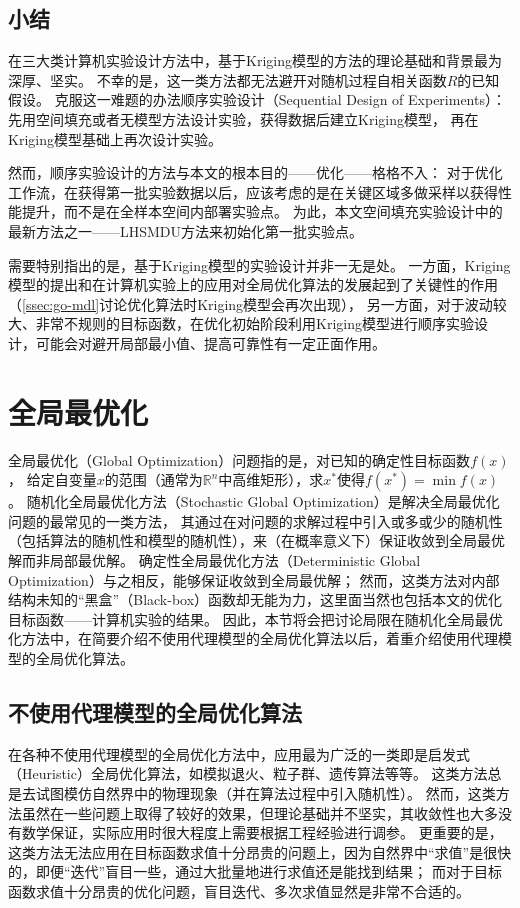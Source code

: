 \documentclass[index]{subfiles}
\begin{document}
\subsection{小结}
在三大类计算机实验设计方法中，基于Kriging模型的方法的理论基础和背景最为深厚、坚实。
不幸的是，这一类方法都无法避开对随机过程自相关函数$R$的已知假设。
克服这一难题的办法顺序实验设计（Sequential Design of Experiments）：
先用空间填充或者无模型方法设计实验，获得数据后建立Kriging模型，
再在Kriging模型基础上再次设计实验。

然而，顺序实验设计的方法与本文的根本目的——优化——格格不入：
对于优化工作流，在获得第一批实验数据以后，应该考虑的是在关键区域多做采样以获得性能提升，而不是在全样本空间内部署实验点。
为此，本文空间填充实验设计中的最新方法之一——LHSMDU方法来初始化第一批实验点。

需要特别指出的是，基于Kriging模型的实验设计并非一无是处。
一方面，Kriging模型的提出和在计算机实验上的应用对全局优化算法的发展起到了关键性的作用（\cref{ssec:go-mdl}讨论优化算法时Kriging模型会再次出现），
另一方面，对于波动较大、非常不规则的目标函数，在优化初始阶段利用Kriging模型进行顺序实验设计，可能会对避开局部最小值、提高可靠性有一定正面作用。

\section{全局最优化}
全局最优化（Global Optimization）问题指的是，对已知的确定性目标函数$f(x)$，
给定自变量$x$的范围（通常为$\mathbb{R}^n$中高维矩形），求$x^\ast$使得$f(x^\ast)=\min f(x)$。
随机化全局最优化方法（Stochastic Global Optimization）是解决全局最优化问题的最常见的一类方法，
其通过在对问题的求解过程中引入或多或少的随机性（包括算法的随机性和模型的随机性），来（在概率意义下）保证收敛到全局最优解而非局部最优解。\cite{zhigljavsky2007}
确定性全局最优化方法（Deterministic Global Optimization）与之相反，能够保证收敛到全局最优解；
然而，这类方法对内部结构未知的“黑盒”（Black-box）函数却无能为力，这里面当然也包括本文的优化目标函数——计算机实验的结果。
因此，本节将会把讨论局限在随机化全局最优化方法中，在简要介绍不使用代理模型的全局优化算法以后，着重介绍使用代理模型的全局优化算法。

\subsection{不使用代理模型的全局优化算法}
在各种不使用代理模型的全局优化方法中，应用最为广泛的一类即是启发式（Heuristic）全局优化算法，如模拟退火、粒子群、遗传算法等等。
这类方法总是去试图模仿自然界中的物理现象（并在算法过程中引入随机性）。
然而，这类方法虽然在一些问题上取得了较好的效果，但理论基础并不坚实，其收敛性也大多没有数学保证，实际应用时很大程度上需要根据工程经验进行调参\cite{zhigljavsky2007}。
更重要的是，这类方法无法应用在目标函数求值十分昂贵的问题上，因为自然界中“求值”是很快的，即便“迭代”盲目一些，通过大批量地进行求值还是能找到结果；
而对于目标函数求值十分昂贵的优化问题，盲目迭代、多次求值显然是非常不合适的。
\end{document}
